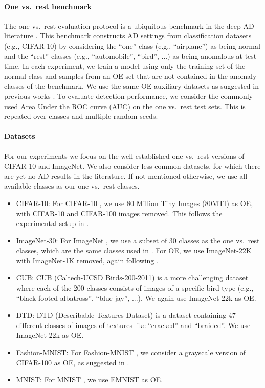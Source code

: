 \documentclass[10pt]{article} \usepackage[accepted]{stylefiles/tmlr}
\begin{document}
\paragraph{One vs.~rest benchmark} The one vs.~rest evaluation protocol is a ubiquitous benchmark in the deep AD literature  \citep{ruff2018deep, golan2018deep, hendrycks2019deep, hendrycks2019using, ruff2020,sohn2021, deecke2021transfer, liznerski2021, reiss2021panda}.
This benchmark constructs AD settings from classification datasets (e.g., CIFAR-10) by considering the ``one'' class (e.g., ``airplane'') as being normal and the ``rest'' classes (e.g., ``automobile'', ``bird'', ...) as being anomalous at test time.
In each experiment, we train a model using only the training set of the normal class and samples from an OE set that are not contained in the anomaly classes of the benchmark. 
We use the same OE auxiliary datasets as suggested in previous works \citep{hendrycks2019deep,hendrycks2019using,liznerski2021}.
To evaluate detection performance, we consider the commonly used Area Under the ROC curve (AUC) on the one vs.~rest test sets. 
This is repeated over classes and multiple random seeds. 

\paragraph{Datasets}
For our experiments we focus on the well-established one vs.~rest versions of CIFAR-10 and ImageNet. We also consider less common datasets, for which there are yet no AD results in the literature. If not mentioned otherwise, we use all available classes as our one vs.~rest classes.
\begin{itemize}[noitemsep,topsep=-8pt,leftmargin=*]
    \item CIFAR-10: For CIFAR-10 \citep{krizhevsky2009learning}, we use 80 Million Tiny Images (80MTI)\citep{torralba200880} as OE, with CIFAR-10 and CIFAR-100 images removed. 
    This follows the experimental setup in \citet{hendrycks2019using}. 
    \item ImageNet-30: For ImageNet \citep{imagenet}, we use a subset of 30 classes as the one vs.~rest classes, which are the same classes used in \citet{hendrycks2019using}. 
    For OE, we use ImageNet-22K with ImageNet-1K removed, again following \citet{hendrycks2019using}. 
    \item CUB: CUB (Caltech-UCSD Birds-200-2011) \citep{cub} is a more challenging dataset where each of the 200 classes consists of images of a specific bird type (e.g., ``black footed albatross'', ``blue jay'', ...). We again use ImageNet-22k as OE.
    \item DTD: DTD (Describable Textures Dataset) \citep{dtd} is a dataset containing 47 different classes of images of textures like ``cracked'' and ``braided''. We use ImageNet-22k as OE.
    \item Fashion-MNIST: For Fashion-MNIST \citep{fmnist}, we consider a grayscale version of CIFAR-100 as OE, as suggested in \citet{liznerski2021}.
    \item MNIST: For MNIST \citep{mnist}, we use EMNIST \citep{emnist} as OE.
\end{itemize}
\end{document}
